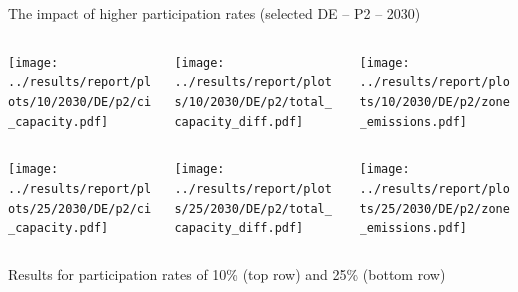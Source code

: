 \begin{frame}{The impact of higher participation rates (selected DE -- P2 -- 2030)}

  {\footnotesize

  \begin{columns}
  \begin{column}{5cm}
  \centering
  \texttt{[image: ../results/report/plots/10/2030/DE/p2/ci\_capacity.pdf]}
  \end{column}

  \begin{column}{5cm}
  \centering
  \texttt{[image: ../results/report/plots/10/2030/DE/p2/total\_capacity\_diff.pdf]}
  \end{column}

  \begin{column}{5cm}
  \centering
  \texttt{[image: ../results/report/plots/10/2030/DE/p2/zone\_emissions.pdf]}
  \end{column}

  \end{columns}

  \begin{columns}
    \begin{column}{5cm}
    \centering
    \texttt{[image: ../results/report/plots/25/2030/DE/p2/ci\_capacity.pdf]}
    \end{column}
  
    \begin{column}{5cm}
    \centering
    \texttt{[image: ../results/report/plots/25/2030/DE/p2/total\_capacity\_diff.pdf]}
    \end{column}
  
    \begin{column}{5cm}
    \centering
    \texttt{[image: ../results/report/plots/25/2030/DE/p2/zone\_emissions.pdf]}
    \end{column}

  \end{columns}

  \begin{columns}
    \begin{column}{15cm}
    {\scriptsize
    Results for participation rates of 10\% (top row) and 25\% (bottom row)
    }
    \end{column}
    \end{columns}
  }

\end{frame}




